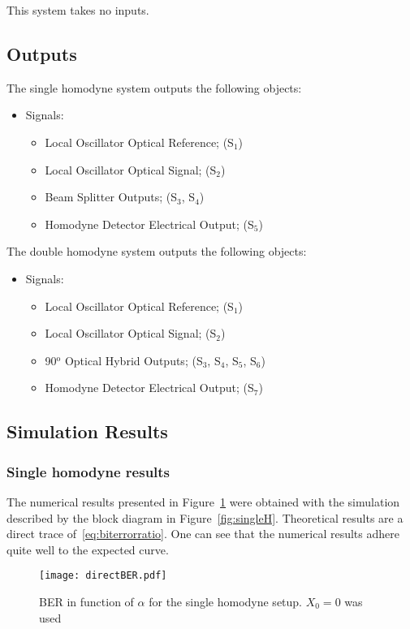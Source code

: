 \documentclass[../../sdf/tex/cv_system]{subfiles}
\begin{document}
This system takes no inputs.
%
\subsection{Outputs}

The single homodyne system outputs the following objects:
\begin{itemize}
\item Signals:
\begin{itemize}
\item Local Oscillator Optical Reference; (S$_{1}$)
\item Local Oscillator Optical Signal; (S$_{2}$)
\item Beam Splitter Outputs; (S$_{3}$, S$_{4}$)
\item Homodyne Detector Electrical Output; (S$_{5}$)
\end{itemize}
\end{itemize}
\par
The double homodyne system outputs the following objects:
\begin{itemize}
\item Signals:
\begin{itemize}
\item Local Oscillator Optical Reference; (S$_{1}$)
\item Local Oscillator Optical Signal; (S$_{2}$)
\item 90$^\text{o}$ Optical Hybrid Outputs; (S$_{3}$, S$_{4}$, S$_{5}$, S$_{6}$)
\item Homodyne Detector Electrical Output; (S$_{7}$)
\end{itemize}
\end{itemize}		

\subsection{Simulation Results}
\subsubsection{Single homodyne results}\label{subsec:SHresults}

The numerical results presented in Figure~\ref{fig:directber} were obtained with the simulation described by the block diagram in Figure~\ref{fig:singleH}. Theoretical results are a direct trace of~\eqref{eq:biterrorratio}. One can see that the numerical results adhere quite well to the expected curve.

\begin{figure}[h]
\centering
\texttt{[image: directBER.pdf]}
\caption{BER in function of $\alpha$ for the single homodyne setup. $X_0=0$ was used}
\label{fig:directber}
\end{figure}
\end{document}
